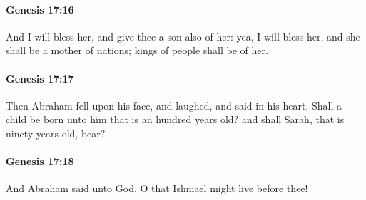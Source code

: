 		\paragraph{Genesis 17:16} %
			\label{GENESIS-17-16}

			And I will bless her, and give thee a son also of her: yea, I will bless her, and she shall be a mother of nations; kings of people shall be of her.


		\paragraph{Genesis 17:17} %
			\label{GENESIS-17-17}

			Then Abraham fell upon his face, and laughed, and said in his heart, Shall a child be born unto him that is an hundred years old?  and shall Sarah, that is ninety years old, bear?


		\paragraph{Genesis 17:18} %
			\label{GENESIS-17-18}

			And Abraham said unto God, O that Ishmael might live before thee!


